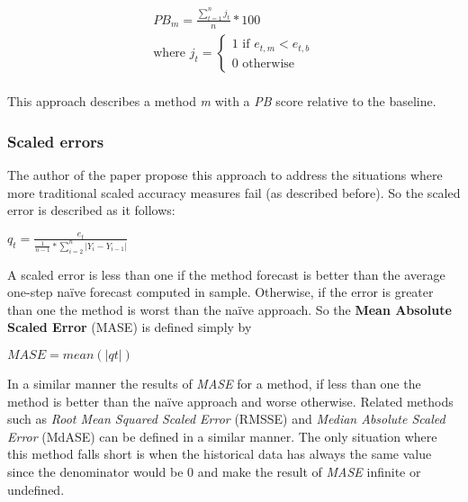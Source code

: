 \Large
\begin{align*}
 PB_m=\frac{\sum\limits_{t=1}^n j_t}{n}*100\\ \text{where }j_t =
 \begin{cases}\text{1 if }e_{t,m} < e_{t,b}\\ \text{0 otherwise }\end{cases}
\end{align*}
\normalsize
\\

This approach describes a method \emph{m} with a \emph{PB} score relative to the
baseline.

\subsubsection{Scaled errors}

The author of the paper \cite{Hyndman2006679} propose this approach to address
the situations where more traditional scaled accuracy measures fail (as
described before). So the scaled error is described as it follows:

\begin{center}
\Large
\begin{math}
  q_t = \frac{e_t}{\frac{1}{n-1}*\sum\limits_{i=2}^n\left|Y_i - Y_{i-1}\right|}
\end{math}
\normalsize
\end{center}

A scaled error is less than one if the method forecast is better than the
average one-step na\"{i}ve forecast computed in sample. Otherwise, if the error
is greater than one the method is worst than the na\"{i}ve approach.
So the \textbf{Mean Absolute Scaled Error} (MASE) is defined simply by

\begin{center}
\Large
\begin{math}
  MASE = mean(\left|qt\right|)
\end{math}
\normalsize
\end{center}

In a similar manner the results of \emph{MASE} for a method, if less than one
the method is better than the na\"{i}ve approach and worse otherwise.
Related methods such as \emph{Root Mean Squared Scaled Error} (RMSSE) and
\emph{Median Absolute Scaled Error} (MdASE) can be defined in a similar manner.
The only situation where this method falls short is when the historical data has
always the same value since the denominator would be 0 and make the result of
\emph{MASE} infinite or undefined.


